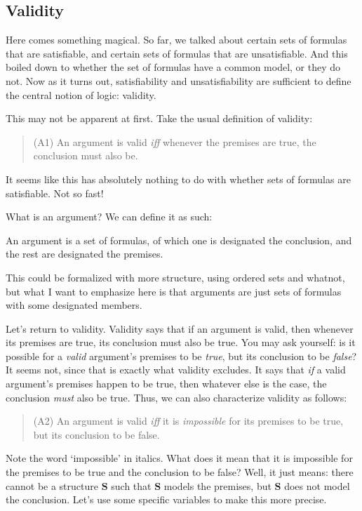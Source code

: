 \subsection{Validity}

Here comes something magical. So far, we talked about certain sets of formulas that are satisfiable, and certain sets of formulas that are unsatisfiable. And this boiled down to whether the set of formulas have a common model, or they do not. Now as it turns out, satisfiability and unsatisfiability are sufficient to define the central notion of logic: validity. 

This may not be apparent at first. Take the usual definition of validity:

\begin{quote}
(A1) An argument is valid \textit{iff} whenever the premises are true, the conclusion must also be. 
\end{quote}

It seems like this has absolutely nothing to do with whether sets of formulas are satisfiable. Not so fast!

What is an argument? We can define it as such:

\begin{defn}
An argument is a set of formulas, of which one is designated the conclusion, and the rest are designated the premises. 
\end{defn}

This could be formalized with more structure, using ordered sets and whatnot, but what I want to emphasize here is that arguments are just sets of formulas with some designated members. 

Let's return to validity. Validity says that if an argument is valid, then whenever its premises are true, its conclusion must also be true. You may ask yourself: is it possible for a \textit{valid} argument's premises to be \textit{true}, but its conclusion to be \textit{false}? It seems not, since that is exactly what validity excludes. It says that \textit{if} a valid argument's premises happen to be true, then whatever else is the case, the conclusion \textit{must} also be true. Thus, we can also characterize validity as follows:

\begin{quote}
(A2) An argument is valid \textit{iff} it is \textit{impossible} for its premises to be true, but its conclusion to be false. 
\end{quote}

Note the word `impossible' in italics. What does it mean that it is impossible for the premises to be true and the conclusion to be false? Well, it just means: there cannot be a structure $\mathbf{S}$ such that $\mathbf{S}$ models the premises, but $\mathbf{S}$ does not model the conclusion. Let's use some specific variables to make this more precise. 

